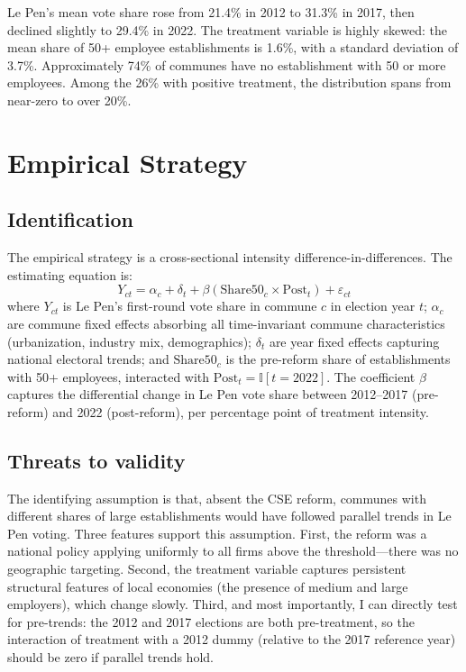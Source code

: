 \documentclass[12pt]{article}
\newcommand{\ind}{\mathbb{I}}
\begin{document}


Le Pen's mean vote share rose from 21.4\% in 2012 to 31.3\% in 2017, then declined slightly to 29.4\% in 2022. The treatment variable is highly skewed: the mean share of 50+ employee establishments is 1.6\%, with a standard deviation of 3.7\%. Approximately 74\% of communes have no establishment with 50 or more employees. Among the 26\% with positive treatment, the distribution spans from near-zero to over 20\%.


\section{Empirical Strategy}

\subsection{Identification}

The empirical strategy is a cross-sectional intensity difference-in-differences. The estimating equation is:
\begin{equation}
Y_{ct} = \alpha_c + \delta_t + \beta \left( \text{Share50}_{c} \times \text{Post}_t \right) + \varepsilon_{ct}
\label{eq:did}
\end{equation}
where $Y_{ct}$ is Le Pen's first-round vote share in commune $c$ in election year $t$; $\alpha_c$ are commune fixed effects absorbing all time-invariant commune characteristics (urbanization, industry mix, demographics); $\delta_t$ are year fixed effects capturing national electoral trends; and $\text{Share50}_c$ is the pre-reform share of establishments with 50+ employees, interacted with $\text{Post}_t = \ind[t = 2022]$. The coefficient $\beta$ captures the differential change in Le Pen vote share between 2012--2017 (pre-reform) and 2022 (post-reform), per percentage point of treatment intensity.

\subsection{Threats to validity}

The identifying assumption is that, absent the CSE reform, communes with different shares of large establishments would have followed parallel trends in Le Pen voting. Three features support this assumption. First, the reform was a national policy applying uniformly to all firms above the threshold---there was no geographic targeting. Second, the treatment variable captures persistent structural features of local economies (the presence of medium and large employers), which change slowly. Third, and most importantly, I can directly test for pre-trends: the 2012 and 2017 elections are both pre-treatment, so the interaction of treatment with a 2012 dummy (relative to the 2017 reference year) should be zero if parallel trends hold.
\end{document}

